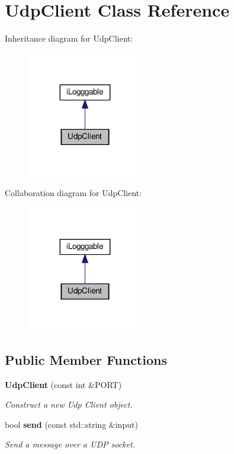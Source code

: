 \section{Udp\+Client Class Reference}
\label{class_udp_client}


Inheritance diagram for Udp\+Client\+:
\nopagebreak
\begin{figure}[H]
\begin{center}
\leavevmode
\includegraphics[width=143pt]{class_udp_client__inherit__graph}
\end{center}
\end{figure}


Collaboration diagram for Udp\+Client\+:
\nopagebreak
\begin{figure}[H]
\begin{center}
\leavevmode
\includegraphics[width=143pt]{class_udp_client__coll__graph}
\end{center}
\end{figure}
\subsection*{Public Member Functions}
\begin{DoxyCompactItemize}
\item 
\textbf{ Udp\+Client} (const int \&P\+O\+RT)
\begin{DoxyCompactList}\small\item\em Construct a new Udp Client object. \end{DoxyCompactList}\item 
bool \textbf{ send} (const std\+::string \&input)
\begin{DoxyCompactList}\small\item\em Send a message over a U\+DP socket. \end{DoxyCompactList}\end{DoxyCompactItemize}


